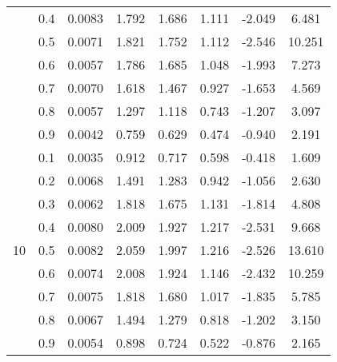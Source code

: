 \documentclass[11pt,a4paper]{report}
\begin{document}
\begin{longtable}{ | c | c || c | c | c | c | c | c | }
 & 0.4 & 0.0083 & 1.792 & 1.686 & 1.111 & -2.049 & 6.481 \\
 & 0.5 & 0.0071 & 1.821 & 1.752 & 1.112 & -2.546 & 10.251 \\
 & 0.6 & 0.0057 & 1.786 & 1.685 & 1.048 & -1.993 & 7.273 \\
 & 0.7 & 0.0070 & 1.618 & 1.467 & 0.927 & -1.653 & 4.569 \\
 & 0.8 & 0.0057 & 1.297 & 1.118 & 0.743 & -1.207 & 3.097 \\
 & 0.9 & 0.0042 & 0.759 & 0.629 & 0.474 & -0.940 & 2.191 \\
 \hline
\multirow{9}{*}{10} & 0.1 & 0.0035 & 0.912 & 0.717 & 0.598 & -0.418 & 1.609 \\
 & 0.2 & 0.0068 & 1.491 & 1.283 & 0.942 & -1.056 & 2.630 \\
 & 0.3 & 0.0062 & 1.818 & 1.675 & 1.131 & -1.814 & 4.808 \\
 & 0.4 & 0.0080 & 2.009 & 1.927 & 1.217 & -2.531 & 9.668 \\
 & 0.5 & 0.0082 & 2.059 & 1.997 & 1.216 & -2.526 & 13.610 \\
 & 0.6 & 0.0074 & 2.008 & 1.924 & 1.146 & -2.432 & 10.259 \\
 & 0.7 & 0.0075 & 1.818 & 1.680 & 1.017 & -1.835 & 5.785 \\
 & 0.8 & 0.0067 & 1.494 & 1.279 & 0.818 & -1.202 & 3.150 \\
 & 0.9 & 0.0054 & 0.898 & 0.724 & 0.522 & -0.876 & 2.165 \\
 \hline
\hline
\end{longtable}
\end{document}
